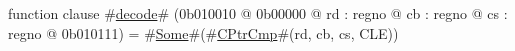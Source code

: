 function clause #\hyperref[zdecode]{decode}# (0b010010 @ 0b00000 @ rd : regno @ cb : regno @ cs : regno @ 0b010111) = #\hyperref[zSome]{Some}#(#\hyperref[zCPtrCmp]{CPtrCmp}#(rd, cb, cs, CLE))
